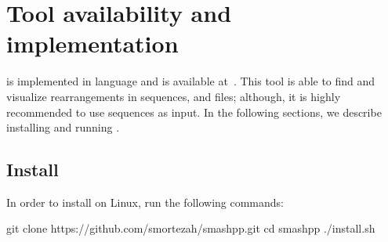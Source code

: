 \clearpage
\section{Tool availability and implementation}
\label{sec.tool}
\smashpp is implemented in \cpp language and is available at~\cite{web-smashpp}. This tool is able to find and visualize rearrangements in sequences, \fasta and \fastq files; although, it is highly recommended to use sequences as input. In the following sections, we describe installing and running \smashpp.

\subsection{Install}
In order to install \smashpp on Linux, run the following commands:
\begin{code}[style=bash]
git clone https://github.com/smortezah/smashpp.git
cd smashpp
./install.sh
\end{code}

